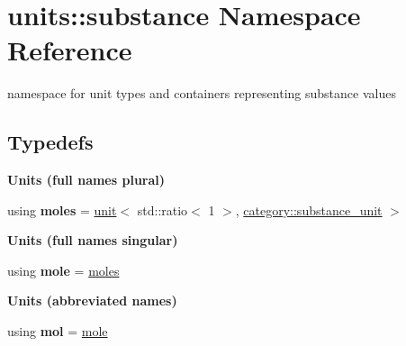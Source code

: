 \hypertarget{namespaceunits_1_1substance}{}\section{units\+:\+:substance Namespace Reference}
\label{namespaceunits_1_1substance}


namespace for unit types and containers representing substance values  


\subsection*{Typedefs}
\begin{Indent}{\bf Units (full names plural)}\par
\begin{DoxyCompactItemize}
\item 
\hypertarget{namespaceunits_1_1substance_a92dd5c3ed61fe14c6d675e761b7da7d8}{}using {\bfseries moles} = \hyperlink{structunits_1_1unit}{unit}$<$ std\+::ratio$<$ 1 $>$, \hyperlink{namespaceunits_1_1category_a9603923620ee542573e69d4d16c0ce3e}{category\+::substance\+\_\+unit} $>$\label{namespaceunits_1_1substance_a92dd5c3ed61fe14c6d675e761b7da7d8}

\end{DoxyCompactItemize}
\end{Indent}
\begin{Indent}{\bf Units (full names singular)}\par
\begin{DoxyCompactItemize}
\item 
\hypertarget{namespaceunits_1_1substance_a1ceb9273abf7ad35b8eb0e4cc178e4c0}{}using {\bfseries mole} = \hyperlink{structunits_1_1unit}{moles}\label{namespaceunits_1_1substance_a1ceb9273abf7ad35b8eb0e4cc178e4c0}

\end{DoxyCompactItemize}
\end{Indent}
\begin{Indent}{\bf Units (abbreviated names)}\par
\begin{DoxyCompactItemize}
\item 
\hypertarget{namespaceunits_1_1substance_aefe2e147d5b90a5589c6efeb2081cea7}{}using {\bfseries mol} = \hyperlink{structunits_1_1unit}{mole}\label{namespaceunits_1_1substance_aefe2e147d5b90a5589c6efeb2081cea7}

\end{DoxyCompactItemize}
\end{Indent}
